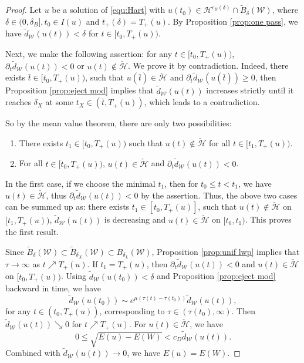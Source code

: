 \documentclass[reqno, 11pt]{amsart}
\numberwithin{equation}{section}
\theoremstyle{plain}
\theoremstyle{definition}
\numberwithin{equation}{section}
\numberwithin{theorem}{section}
\numberwithin{equation}{section}
\numberwithin{equation}{section}
\numberwithin{theorem}{section}
\begin{document}
	\begin{proof}
		Let $u$ be a solution of \eqref{equ:Hart} with $u(t_0)\in \mathcal{H}^{\epsilon_B(\delta)} \cap \widetilde{B}_{\delta}(\mathcal{W})$, where $\delta\in (0,\delta_{B}], t_0\in I(u)$ and $t_+(\delta)=T_+(u)$. By Proposition \ref{prop:one pass}, we have $\widetilde{d}_{\mathcal{W}}(u(t))<\delta$ for $t\in[t_0,T_+(u))$.
		
		Next, we make the following assertion: for any $t\in[t_0,T_+(u))$, $\partial_t \widetilde{d}_{\mathcal{W}}(u(t))<0$ or $u(t)\notin \check{\mathcal{H}}$. We prove it by contradiction. Indeed, there exists $\bar{t}\in[t_0,T_+(u))$, such that $u(\bar{t})\in \check{\mathcal{H}}$ and $\partial_t \widetilde{d}_{\mathcal{W}}(u(\bar{t}))\geq0$, then Proposition \ref{prop:eject mod} implies that $\widetilde{d}_{\mathcal{W}}(u(t))$ increases strictly until it reaches $\delta_{X}$ at some $t_{X}\in (\bar{t},T_{+}(u))$, which leads to a contradiction.
		
		So by the mean value theorem, there are only two possibilities:
		\begin{enumerate}
			\item[$(1)$] There exists $t_1\in [t_0,T_+(u))$ such that $u(t)\notin \check{\mathcal{H}}$ for all $t\in[t_1,T_+(u))$. 
			\item[$(2)$] For all $t\in[t_0,T_+(u))$, $u(t)\in \check{\mathcal{H}}$ and $\partial_t \widetilde{d}_{\mathcal{W}}(u(t))<0$.
		\end{enumerate}
		In the first case, if we choose the minimal $t_1$, then for $t_0\leq t<t_1$, we have $u(t)\in \check{\mathcal{H}}$, thus $\partial_t \widetilde{d}_{\mathcal{W}}(u(t))<0$ by the assertion. Thus, the above two cases can be summed up as: there exists $t_1\in [t_0, T_+(u)]$, such that $u(t)\notin \check{\mathcal{H}}$ on $[t_1, T_+(u))$, $\widetilde{d}_{\mathcal{W}}(u(t))$ is decreasing  and $u(t)\in \check{\mathcal{H}}$ on $[t_0,t_1)$. This proves the first result.
		
		Since $\widetilde{B}_{\delta}(\mathcal{W})\subset \widetilde{B}_{\delta_X}(\mathcal{W})\subset B_{\delta_L}(\mathcal{W})$, Proposition \ref{prop:unif lwp} implies that $\tau\rightarrow\infty$ as $t\nearrow T_+(u)$. If $t_1=T_{+}(u)$, then $\partial_t\widetilde{d}_{\mathcal{W}}(u(t))<0$ and $u(t)\in \check{\mathcal{H}}$ on $[t_0, T_+(u))$. Using $\widetilde{d}_{\mathcal{W}}(u(t_0))<\delta$ and Proposition \ref{prop:eject mod} backward in time, we have
		\begin{equation*}
		\widetilde{d}_{\mathcal{W}}(u(t_0)) \sim e^{\mu(\tau(t)-\tau(t_0))}\widetilde{d}_{\mathcal{W}}(u(t)),
		\end{equation*}
		for any $t\in(t_0,T_+(u))$, corresponding to $\tau\in(\tau(t_0),\infty)$. Then $\widetilde{d}_{\mathcal{W}}(u(t))\searrow0$ for $t\nearrow T_+(u)$. For $u(t)\in \check{\mathcal{H}}$, we have 
		\begin{equation*}
		0\leq \sqrt{E(u)-E(W)}< c_D\widetilde{d}_{\mathcal{W}}(u(t)).
		\end{equation*}
		Combined with $\widetilde{d}_{\mathcal{W}}(u(t))\rightarrow0$, we have $E(u)=E(W)$.
	\end{proof}
	
\end{document}
